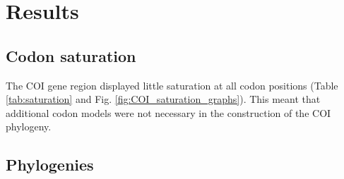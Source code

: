 \chapter{Results}

\section{Codon saturation}

The COI gene region displayed little saturation at all codon positions (Table \ref{tab:saturation} and Fig. \ref{fig:COI_saturation_graphs}). This meant that additional codon models were not necessary in the construction of the COI phylogeny.

\section{Phylogenies}

